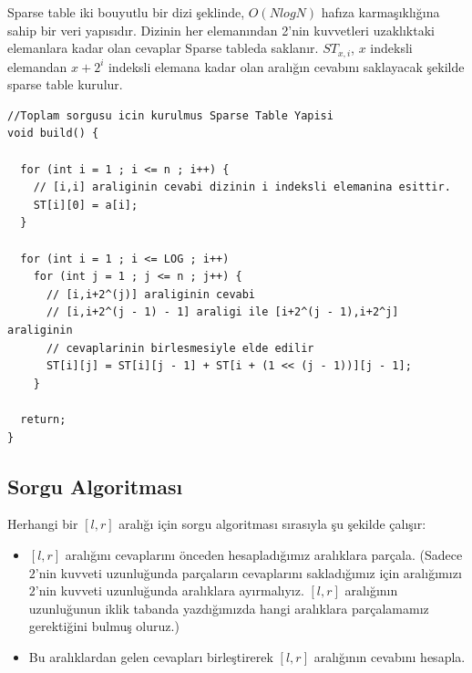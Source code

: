 \documentclass[12pt]{article}
\begin{document}
    Sparse table iki bouyutlu bir dizi \c{s}eklinde, $O(NlogN)$ haf{\i}za karma\c{s}{\i}kl{\i}\u{g}{\i}na sahip bir veri yap{\i}s{\i}d{\i}r. Dizinin her eleman{\i}ndan 2'nin kuvvetleri uzakl{\i}ktaki elemanlara kadar olan cevaplar Sparse tableda saklan{\i}r. $ST_{x,i}$, $x$ indeksli elemandan $x + 2^i$ indeksli elemana kadar olan aral{\i}\u{g}{\i}n cevab{\i}n{\i} saklayacak \c{s}ekilde sparse table kurulur.
    
    \begin{verbatim}
//Toplam sorgusu icin kurulmus Sparse Table Yapisi
void build() {

  for (int i = 1 ; i <= n ; i++) {
    // [i,i] araliginin cevabi dizinin i indeksli elemanina esittir.
    ST[i][0] = a[i];
  }

  for (int i = 1 ; i <= LOG ; i++)
    for (int j = 1 ; j <= n ; j++) {
      // [i,i+2^(j)] araliginin cevabi
      // [i,i+2^(j - 1) - 1] araligi ile [i+2^(j - 1),i+2^j] araliginin
      // cevaplarinin birlesmesiyle elde edilir
      ST[i][j] = ST[i][j - 1] + ST[i + (1 << (j - 1))][j - 1];
    }

  return;
}
    \end{verbatim}
    \cleardoublepage
    
    \subsection{Sorgu Algoritmas{\i}}
    
    Herhangi bir $[l,r]$ aral{\i}\u{g}{\i} i\c{c}in sorgu algoritmas{\i} s{\i}ras{\i}yla \c{s}u \c{s}ekilde \c{c}al{\i}\c{s}{\i}r:
    
    \begin{itemize}
        \item $[l,r]$ aral{\i}\u{g}{\i}n{\i} cevaplar{\i}n{\i} \"{o}nceden hesaplad{\i}\u{g}{\i}m{\i}z aral{\i}klara par\c{c}ala. (Sadece $2$'nin kuvveti uzunlu\u{g}unda par\c{c}alar{\i}n cevaplar{\i}n{\i} saklad{\i}\u{g}{\i}m{\i}z i\c{c}in aral{\i}\u{g}{\i}m{\i}z{\i} $2$'nin kuvveti uzunlu\u{g}unda aral{\i}klara ay{\i}rmal{\i}y{\i}z. $[l,r]$ aral{\i}\u{g}{\i}n{\i}n uzunlu\u{g}unun iklik tabanda yazd{\i}\u{g}{\i}m{\i}zda hangi aral{\i}klara par\c{c}alamam{\i}z gerekti\u{g}ini bulmu\c{s} oluruz.) 
        
        \item Bu aral{\i}klardan gelen cevaplar{\i} birle\c{s}tirerek $[l,r]$ aral{\i}\u{g}{\i}n{\i}n cevab{\i}n{\i} hesapla.
        
    \end{itemize}
    
\end{document}
